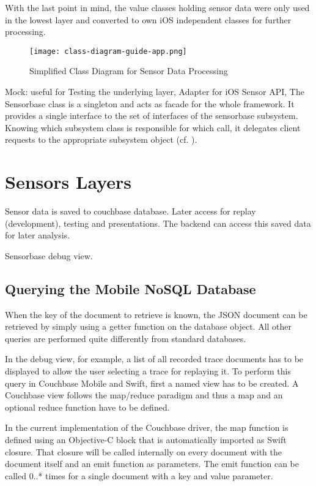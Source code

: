 With the last point in mind, the value classes holding sensor data were only used in the lowest layer and converted to own iOS independent classes for further processing.



\begin{figure}[H]
\centering
\texttt{[image: class-diagram-guide-app.png]}
\caption{Simplified Class Diagram for Sensor Data Processing}
\end{figure}

Mock: useful for Testing the underlying layer,
Adapter for iOS Sensor API,
The Sensorbase class is a singleton and acts as facade for the whole framework. It provides a single interface to the set of interfaces of the sensorbase subsystem. Knowing which subsystem class is responsible for which call, it delegates client requests to the appropriate subsystem object (cf. \cite{gof}).


\section{Sensors Layers}

Sensor data is saved to couchbase database.
Later access for replay (development), testing and presentations.
The backend can access this saved data for later analysis.

Sensorbase debug view.
\cite{GCD-Reference}

\subsection{Querying the Mobile NoSQL Database}
\label{sec:nosql-query}

When the key of the document to retrieve is known, the JSON document can be retrieved by simply using a getter function on the database object. All other queries are performed quite differently from standard databases. 

In the debug view, for example, a list of all recorded trace documents has to be displayed to allow the user selecting a trace for replaying it.
To perform this query in Couchbase Mobile and Swift, first a named view has to be created. A Couchbase view follows the map/reduce paradigm and thus a map and an optional reduce function have to be defined. 

In the current implementation of the Couchbase driver, the map function is defined using an Objective-C block that is automatically imported as Swift closure. That closure will be called internally on every document with the document itself and an emit function as parameters. The emit function can be called 0..* times for a single document with a key and value parameter. 

